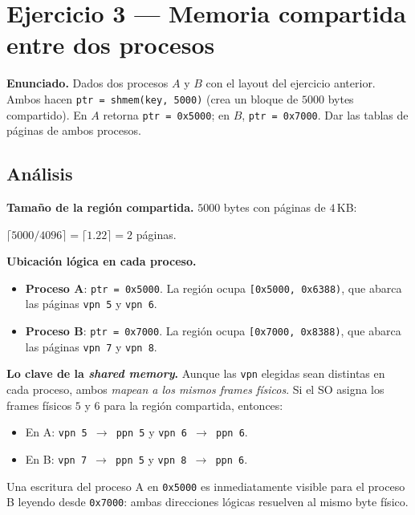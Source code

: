 \documentclass[11pt,a4paper]{article}
\begin{document}
\section{Ejercicio 3 --- Memoria compartida entre dos procesos}

\textbf{Enunciado.} Dados dos procesos $A$ y $B$ con el layout del
ejercicio anterior. Ambos hacen
\verb|ptr = shmem(key, 5000)| (crea un bloque de $5000$ bytes
compartido). En $A$ retorna \texttt{ptr = 0x5000}; en $B$,
\texttt{ptr = 0x7000}. Dar las tablas de páginas de ambos procesos.

\subsection*{Análisis}

\textbf{Tamaño de la región compartida.} $5000$ bytes con páginas de
$4$\,KB:

\quad $\lceil 5000 / 4096 \rceil = \lceil 1.22 \rceil = 2$ páginas.

\textbf{Ubicación lógica en cada proceso.}

\begin{itemize}[leftmargin=*]
    \item \textbf{Proceso A}: \texttt{ptr = 0x5000}. La región ocupa
        \texttt{[0x5000, 0x6388)}, que abarca las páginas
        \texttt{vpn 5} y \texttt{vpn 6}.
    \item \textbf{Proceso B}: \texttt{ptr = 0x7000}. La región ocupa
        \texttt{[0x7000, 0x8388)}, que abarca las páginas
        \texttt{vpn 7} y \texttt{vpn 8}.
\end{itemize}

\textbf{Lo clave de la \emph{shared memory}.} Aunque las
\texttt{vpn} elegidas sean distintas en cada proceso, ambos
\emph{mapean a los mismos frames físicos}. Si el SO asigna los
frames físicos $5$ y $6$ para la región compartida, entonces:

\begin{itemize}[leftmargin=*,nosep]
    \item En A: \texttt{vpn 5 $\to$ ppn 5} y \texttt{vpn 6 $\to$ ppn 6}.
    \item En B: \texttt{vpn 7 $\to$ ppn 5} y \texttt{vpn 8 $\to$ ppn 6}.
\end{itemize}

Una escritura del proceso A en \texttt{0x5000} es inmediatamente
visible para el proceso B leyendo desde \texttt{0x7000}: ambas
direcciones lógicas resuelven al mismo byte físico.
\end{document}
